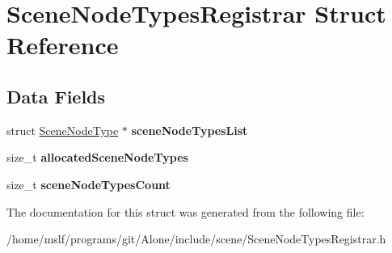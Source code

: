 \hypertarget{struct_scene_node_types_registrar}{}\section{Scene\+Node\+Types\+Registrar Struct Reference}
\label{struct_scene_node_types_registrar}
\subsection*{Data Fields}
\begin{DoxyCompactItemize}
\item 
\hypertarget{struct_scene_node_types_registrar_a26220f07d07585c20b71ddab90783db6}{}\label{struct_scene_node_types_registrar_a26220f07d07585c20b71ddab90783db6} 
struct \hyperlink{struct_scene_node_type}{Scene\+Node\+Type} $\ast$ {\bfseries scene\+Node\+Types\+List}
\item 
\hypertarget{struct_scene_node_types_registrar_a5a1d22eb74c59dd10779143e8b799dd0}{}\label{struct_scene_node_types_registrar_a5a1d22eb74c59dd10779143e8b799dd0} 
size\+\_\+t {\bfseries allocated\+Scene\+Node\+Types}
\item 
\hypertarget{struct_scene_node_types_registrar_a431a77356de72071ae14aaf0fdd5894d}{}\label{struct_scene_node_types_registrar_a431a77356de72071ae14aaf0fdd5894d} 
size\+\_\+t {\bfseries scene\+Node\+Types\+Count}
\end{DoxyCompactItemize}


The documentation for this struct was generated from the following file\+:\begin{DoxyCompactItemize}
\item 
/home/mslf/programs/git/\+Alone/include/scene/Scene\+Node\+Types\+Registrar.\+h\end{DoxyCompactItemize}
